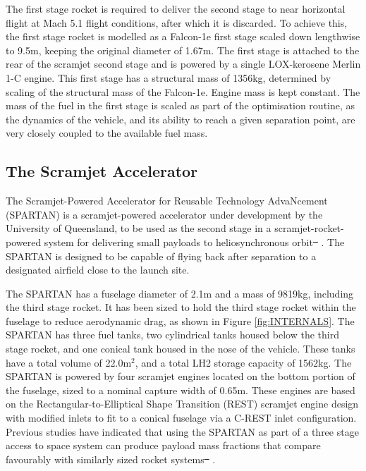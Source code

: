 \documentclass[journal]{new-aiaa}
\providecommand{\DIFadd}[1]{{\protect\color{blue}\uwave{#1}}} %
\providecommand{\DIFdel}[1]{{\protect\color{red}\sout{#1}}}                      %
\providecommand{\DIFaddbegin}{} %
\providecommand{\DIFaddend}{} %
\providecommand{\DIFdelbegin}{} %
\providecommand{\DIFdelend}{} %
\newcommand{\DIFscaledelfig}{0.5}
\newlength{\DIFdelgraphicswidth} %
\newlength{\DIFdelgraphicsheight} %
\newcommand{\DIFaddincludegraphics}[2][]{{\color{blue}\fbox{\DIFOincludegraphics[#1]{#2}}}} %
\newcommand{\DIFdelincludegraphics}[2][]{%
\sbox{\DIFdelgraphicsbox}{\DIFOincludegraphics[#1]{#2}}%
\settoboxwidth{\DIFdelgraphicswidth}{\DIFdelgraphicsbox} %
\settoboxtotalheight{\DIFdelgraphicsheight}{\DIFdelgraphicsbox} %
\scalebox{\DIFscaledelfig}{%
\parbox[b]{\DIFdelgraphicswidth}{\usebox{\DIFdelgraphicsbox}\\[-\baselineskip] \rule{\DIFdelgraphicswidth}{0em}}\llap{\resizebox{\DIFdelgraphicswidth}{\DIFdelgraphicsheight}{%
\setlength{\unitlength}{\DIFdelgraphicswidth}%
\begin{picture}(1,1)%
\thicklines\linethickness{2pt} %
{\color[rgb]{1,0,0}\put(0,0){\framebox(1,1){}}}%
{\color[rgb]{1,0,0}\put(0,0){\line( 1,1){1}}}%
{\color[rgb]{1,0,0}\put(0,1){\line(1,-1){1}}}%
\end{picture}%
}\hspace*{3pt}}} %
} %
\DeclareRobustCommand{\DIFaddbegin}{\DIFOaddbegin \let\includegraphics\DIFaddincludegraphics} %
\DeclareRobustCommand{\DIFaddend}{\DIFOaddend \let\includegraphics\DIFOincludegraphics} %
\DeclareRobustCommand{\DIFdelbegin}{\DIFOdelbegin \let\includegraphics\DIFdelincludegraphics} %
\DeclareRobustCommand{\DIFdelend}{\DIFOaddend \let\includegraphics\DIFOincludegraphics} %
\begin{document}
The first stage rocket is required to deliver the second stage to near horizontal flight at Mach 5.1 flight conditions, after which it is discarded. To achieve this, the first stage rocket is modelled as a Falcon-1e first stage scaled down lengthwise to 9.5m, keeping the original diameter of 1.67m\cite{Vehicle2008}. The first stage is attached to the rear of the scramjet second stage and is powered by a single LOX-kerosene Merlin 1-C engine.  This first stage has a structural mass of 1356kg, determined by scaling of the structural mass of the Falcon-1e. Engine mass is kept constant. The mass of the fuel in the first stage is scaled as part of the optimisation routine, as the dynamics of the vehicle, and its ability to reach a given separation point, are very closely coupled to the available fuel mass. 




\subsection{The Scramjet Accelerator}
The Scramjet-Powered Accelerator for Reusable Technology AdvaNcement (SPARTAN) is a scramjet-powered accelerator under development by the University of Queensland, to be used as the second stage in a scramjet-rocket-powered system for delivering small payloads to heliosynchronous orbit\DIFdelbegin \DIFdel{\mbox{%
\cite{Preller2017}}%
}\DIFdelend \DIFaddbegin \DIFadd{\mbox{%
\cite{Preller2017b}}%
}\DIFaddend . The SPARTAN is designed to be capable of flying back after separation to a designated airfield close to the launch site.  

The SPARTAN has a fuselage diameter of 2.1m and a mass of 9819kg, including the third stage rocket. It has been sized to hold the third stage rocket within the fuselage to reduce aerodynamic drag, as shown in Figure \ref{fig:INTERNALS}. The SPARTAN has three fuel tanks, two cylindrical tanks housed below the third stage rocket, and one conical tank housed in the nose of the vehicle. These tanks have a total volume of 22.0m$^2$, and a total LH2 storage capacity of 1562kg. 
The SPARTAN is powered by four scramjet engines located on the bottom portion of the fuselage, sized to a nominal capture width of 0.65m. These engines are based on the Rectangular-to-Elliptical Shape Transition (REST) scramjet engine design\cite{Suraweera2009} with modified inlets to fit to a conical fuselage via a C-REST inlet configuration\cite{Gollan2010}. Previous studies have indicated that using the SPARTAN as part of a three stage access to space system can produce payload mass fractions that compare favourably with similarly sized rocket systems\DIFdelbegin \DIFdel{\mbox{%
\cite{Preller2015a,Preller2017}}%
}\DIFdelend \DIFaddbegin \DIFadd{\mbox{%
\cite{Preller2015a,Preller2017b}}%
}\DIFaddend . 
\end{document}
